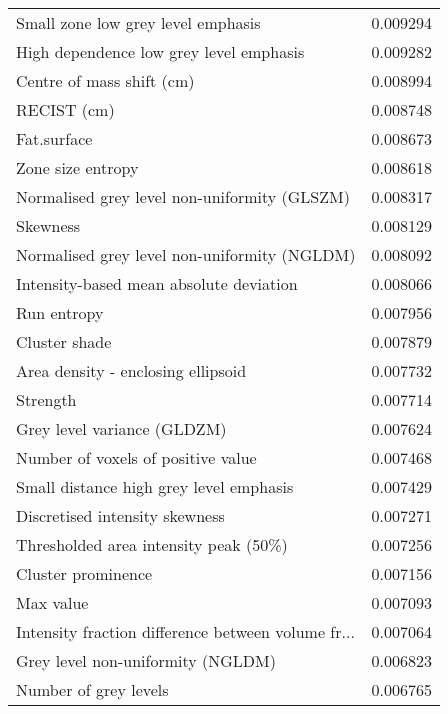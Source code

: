 \begin{longtable}{|lr|}
Small zone low grey level emphasis                 &        0.009294 \\
High dependence low grey level emphasis            &        0.009282 \\
Centre of mass shift (cm)                          &        0.008994 \\
RECIST (cm)                                        &        0.008748 \\
Fat.surface                                        &        0.008673 \\
Zone size entropy                                  &        0.008618 \\
Normalised grey level non-uniformity (GLSZM)       &        0.008317 \\
Skewness                                           &        0.008129 \\
Normalised grey level non-uniformity (NGLDM)       &        0.008092 \\
Intensity-based mean absolute deviation            &        0.008066 \\
Run entropy                                        &        0.007956 \\
Cluster shade                                      &        0.007879 \\
Area density - enclosing ellipsoid                 &        0.007732 \\
Strength                                           &        0.007714 \\
Grey level variance (GLDZM)                        &        0.007624 \\
Number of voxels of positive value                 &        0.007468 \\
Small distance high grey level emphasis            &        0.007429 \\
Discretised intensity skewness                     &        0.007271 \\
Thresholded area intensity peak (50\%)              &        0.007256 \\
Cluster prominence                                 &        0.007156 \\
Max value                                          &        0.007093 \\
Intensity fraction difference between volume fr... &        0.007064 \\
Grey level non-uniformity (NGLDM)                  &        0.006823 \\
Number of grey levels                              &        0.006765 \\

\end{longtable}
